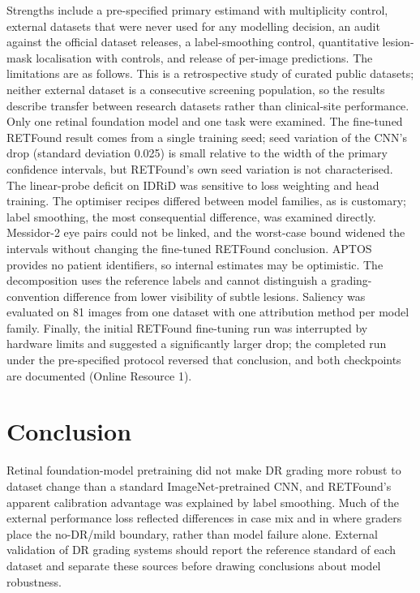 \documentclass[pdflatex,sn-basic,Numbered]{sn-jnl}
\begin{document}
Strengths include a pre-specified primary estimand with multiplicity control, external datasets that were never used for any modelling decision, an audit against the official dataset releases, a label-smoothing control, quantitative lesion-mask localisation with controls, and release of per-image predictions. The limitations are as follows. This is a retrospective study of curated public datasets; neither external dataset is a consecutive screening population, so the results describe transfer between research datasets rather than clinical-site performance. Only one retinal foundation model and one task were examined. The fine-tuned RETFound result comes from a single training seed; seed variation of the CNN's drop (standard deviation 0.025) is small relative to the width of the primary confidence intervals, but RETFound's own seed variation is not characterised. The linear-probe deficit on IDRiD was sensitive to loss weighting and head training. The optimiser recipes differed between model families, as is customary; label smoothing, the most consequential difference, was examined directly. Messidor-2 eye pairs could not be linked, and the worst-case bound widened the intervals without changing the fine-tuned RETFound conclusion. APTOS provides no patient identifiers, so internal estimates may be optimistic. The decomposition uses the reference labels and cannot distinguish a grading-convention difference from lower visibility of subtle lesions. Saliency was evaluated on 81 images from one dataset with one attribution method per model family. Finally, the initial RETFound fine-tuning run was interrupted by hardware limits and suggested a significantly larger drop; the completed run under the pre-specified protocol reversed that conclusion, and both checkpoints are documented (Online Resource 1).

\section{Conclusion}\label{sec:conclusion}

Retinal foundation-model pretraining did not make DR grading more robust to dataset change than a standard ImageNet-pretrained CNN, and RETFound's apparent calibration advantage was explained by label smoothing. Much of the external performance loss reflected differences in case mix and in where graders place the no-DR/mild boundary, rather than model failure alone. External validation of DR grading systems should report the reference standard of each dataset and separate these sources before drawing conclusions about model robustness.
\end{document}
